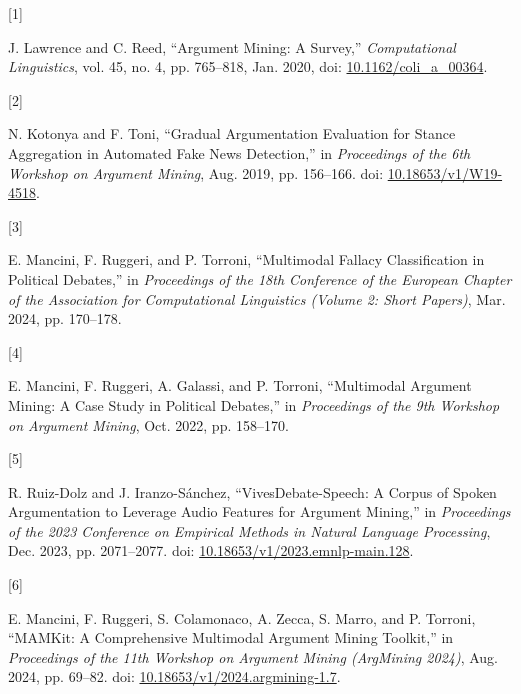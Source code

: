 \documentclass[twocolumn,twoside]{article}
\newlength{\cslhangindent}
\newlength{\csllabelwidth}
\newenvironment{CSLReferences}[2] %
 {\begin{list}{}{%
  \setlength{\itemindent}{0pt}
  \setlength{\leftmargin}{0pt}
  \setlength{\parsep}{0pt}
  \ifodd #1
   \setlength{\leftmargin}{\cslhangindent}
   \setlength{\itemindent}{-1\cslhangindent}
  \fi
  \setlength{\itemsep}{#2\baselineskip}}}
 {\end{list}}
\newcommand{\CSLLeftMargin}[1]{\parbox[t]{\csllabelwidth}{\strut#1\strut}}
\newcommand{\CSLRightInline}[1]{\parbox[t]{\linewidth - \csllabelwidth}{\strut#1\strut}}
\begin{document}
\label{refs}
\begin{CSLReferences}{0}{0}
\CSLLeftMargin{{[}1{]} }%
\CSLRightInline{J. Lawrence and C. Reed, {``Argument {Mining}: {A
Survey},''} \emph{Computational Linguistics}, vol. 45, no. 4, pp.
765--818, Jan. 2020, doi:
\href{https://doi.org/10.1162/coli_a_00364}{10.1162/coli\_a\_00364}.}

\CSLLeftMargin{{[}2{]} }%
\CSLRightInline{N. Kotonya and F. Toni, {``Gradual {Argumentation
Evaluation} for {Stance Aggregation} in {Automated Fake News
Detection},''} in \emph{Proceedings of the 6th {Workshop} on {Argument
Mining}}, Aug. 2019, pp. 156--166. doi:
\href{https://doi.org/10.18653/v1/W19-4518}{10.18653/v1/W19-4518}.}

\CSLLeftMargin{{[}3{]} }%
\CSLRightInline{E. Mancini, F. Ruggeri, and P. Torroni, {``Multimodal
{Fallacy Classification} in {Political Debates},''} in \emph{Proceedings
of the 18th {Conference} of the {European Chapter} of the {Association}
for {Computational Linguistics} ({Volume} 2: {Short Papers})}, Mar.
2024, pp. 170--178.}

\CSLLeftMargin{{[}4{]} }%
\CSLRightInline{E. Mancini, F. Ruggeri, A. Galassi, and P. Torroni,
{``Multimodal {Argument Mining}: {A Case Study} in {Political
Debates},''} in \emph{Proceedings of the 9th {Workshop} on {Argument
Mining}}, Oct. 2022, pp. 158--170.}

\CSLLeftMargin{{[}5{]} }%
\CSLRightInline{R. Ruiz-Dolz and J. Iranzo-Sánchez,
{``{VivesDebate-Speech}: {A Corpus} of {Spoken Argumentation} to
{Leverage Audio Features} for {Argument Mining},''} in \emph{Proceedings
of the 2023 {Conference} on {Empirical Methods} in {Natural Language
Processing}}, Dec. 2023, pp. 2071--2077. doi:
\href{https://doi.org/10.18653/v1/2023.emnlp-main.128}{10.18653/v1/2023.emnlp-main.128}.}

\CSLLeftMargin{{[}6{]} }%
\CSLRightInline{E. Mancini, F. Ruggeri, S. Colamonaco, A. Zecca, S.
Marro, and P. Torroni, {``{MAMKit}: {A Comprehensive Multimodal Argument
Mining Toolkit},''} in \emph{Proceedings of the 11th {Workshop} on
{Argument Mining} ({ArgMining} 2024)}, Aug. 2024, pp. 69--82. doi:
\href{https://doi.org/10.18653/v1/2024.argmining-1.7}{10.18653/v1/2024.argmining-1.7}.}


\end{CSLReferences}
\end{document}
